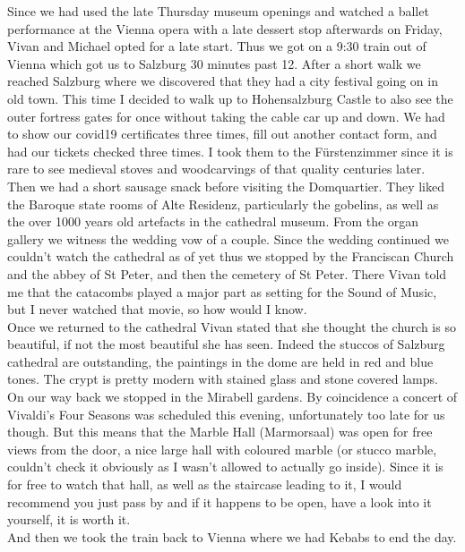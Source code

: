 {Since we had used the late Thursday museum openings and watched a ballet performance at the Vienna opera with a late dessert stop afterwards on Friday, Vivan and Michael opted for a late start. Thus we got on a 9:30 train out of Vienna which got us to Salzburg 30 minutes past 12. After a short walk we reached Salzburg where we discovered that they had a city festival going on in old town. This time I decided to walk up to Hohensalzburg Castle to also see the outer fortress gates for once without taking the cable car up and down. We had to show our covid19 certificates three times, fill out another contact form, and had our tickets checked three times. I took them to the F\"urstenzimmer since it is rare to see medieval stoves and woodcarvings of that quality centuries later.\\
Then we had a short sausage snack before visiting the Domquartier. They liked the Baroque state rooms of Alte Residenz, particularly the gobelins, as well as the over 1000 years old artefacts in the cathedral museum. From the organ gallery we witness the wedding vow of a couple. Since the wedding continued we couldn't watch the cathedral as of yet thus we stopped by the Franciscan Church and the abbey of St Peter, and then the cemetery of St Peter. There Vivan told me that the catacombs played a major part as setting for the Sound of Music, but I never watched that movie, so how would I know.\\
Once we returned to the cathedral Vivan stated that she thought the church is so beautiful, if not the most beautiful she has seen. Indeed the stuccos of Salzburg cathedral are outstanding, the paintings in the dome are held in red and blue tones. The crypt is pretty modern with stained glass and stone covered lamps.\\
On our way back we stopped in the Mirabell gardens. By coincidence a concert of Vivaldi's Four Seasons was scheduled this evening, unfortunately too late for us though. But this means that the Marble Hall (Marmorsaal) was open for free views from the door, a nice large hall with coloured marble (or stucco marble, couldn't check it obviously as I wasn't allowed to actually go inside). Since it is for free to watch that hall, as well as the staircase leading to it, I would recommend you just pass by and if it happens to be open, have a look into it yourself, it is worth it.\\
And then we took the train back to Vienna where we had Kebabs to end the day.\\

}
